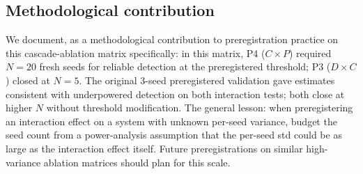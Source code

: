 \subsection{Methodological contribution}

We document, as a methodological contribution to preregistration
practice on this cascade-ablation matrix specifically: in this matrix,
P4 ($C\times P$) required $N\!=\!20$ fresh seeds for reliable detection
at the preregistered threshold; P3 ($D\times C$) closed at $N\!=\!5$.
The original 3-seed preregistered validation gave estimates consistent
with underpowered detection on both interaction tests; both close at
higher $N$ without threshold modification. The general lesson: when
preregistering an interaction effect on a system with unknown
per-seed variance, budget the seed count from a power-analysis
assumption that the per-seed std could be as large as the interaction
effect itself. Future preregistrations on similar high-variance
ablation matrices should plan for this scale.
